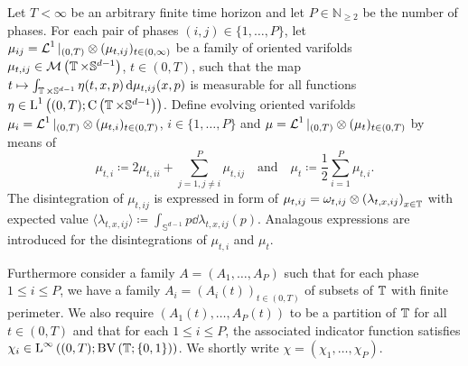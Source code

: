 \begin{definition}
	\label{de_giorgi_varifold_solutions_for_mmcf}
	Let $T < \infty $ be an arbitrary finite time horizon and let $ P \in 
	\mathbb{ N }_{ \geq 2 } $ be the number of phases. For each 
	pair of phases $ ( i , j ) \in \{ 1 , \dotsc, P \} $, let 
	$ \mu_{ i j } = \operatorname{\mathcal{L}}^{ 1 }|_{ ( 0 , T ) } \otimes ( \mu_{ t , i j } )_{ t 
	\in ( 0 , \infty ) } $ be a family of oriented 
	varifolds 
	$ \mu_{ t , ij } \in \mathcal{ M } \left(
	\operatorname{\mathbb{T}} \times \mathbb{ S }^{ d - 1 }
	\right) $,
	$ t \in ( 0 , T ) $, such that the map 
	$ t \mapsto \int_{ \operatorname{\mathbb{T}} \times \mathbb{ S }^{ d - 1 } }
	\eta ( t , x , p )
	\dd{ \mu_{ t ,i j } ( x, p ) }$
	is measurable for all functions 
	$ \eta \in \operatorname{L}^{ 1 } \left(	
	( 0 , T ) ; \operatorname{C} \left( \operatorname{\mathbb{T}} \times \mathbb{ S }^{ d- 1 } 
	\right) 
	\right) $.
	Define evolving oriented varifolds $ \mu_{ i } = \operatorname{\mathcal{L}}^{ 1 }|_{ ( 0 , T 
		) } \otimes ( \mu_{ t , i } )_{ t \in ( 0 , T ) } $, $ i \in \{ 1, 
	\dotsc, P \} $ and $ \mu = \operatorname{\mathcal{L}}^{ 1 }|_{ ( 0 , T ) } \otimes ( \mu_{ t 
	} )_{ t \in ( 0 , T ) } $ by means of
	\begin{equation*}
		\mu_{ t , i }
		\coloneqq
		2 \mu_{ t , i i }
		+
		\sum_{ j = 1 , j \neq i }^{ P }
		\mu_{ t , i j }
		\quad \text{and} \quad
		\mu_{ t }
		\coloneqq
		\frac{ 1 }{ 2 }
		\sum_{ i = 1 }^{ P }
		\mu_{ t, i }.
	\end{equation*}
	The disintegration of $ \mu_{ t , i j } $ is expressed in form of 
	$ \mu_{ t , i j } = \omega_{ t ,i j } \otimes \left( \lambda _{ t , x , i j 
	} \right)_{ x \in \operatorname{\mathbb{T}} } $ with expected value
	$ \langle \lambda_{ t , x , i j } \rangle 
	\coloneqq
	\int_{ \mathbb{ S }^{ d - 1 } }
	p 
	\dd{ \lambda_{ t , x , i j } ( p ) } $.
	Analagous expressions are introduced for the disintegrations of $ \mu_{ t, 
		i } $ and $ \mu_{ t } $.
	
	Furthermore consider a family 
	$ A = \left( A_{ 1 } , \dotsc , A_{ P } \right) $ 
	such that for each phase $ 1 \leq i \leq P $, we have a family
	$ A_{ i } = ( A_{ i } ( t ) )_{ t \in ( 0 , T ) } $ of subsets of $ 
	\operatorname{\mathbb{T}} $ with finite perimeter. We also require 
	$ \left( A_{ 1 } ( t ) , \dotsc, A_{ P } ( t ) \right) $
	to be a partition of $ \operatorname{\mathbb{T}} $ for all $ t \in ( 0 , T ) $ and 
	that for each $ 1 \leq i \leq P $, the associated indicator function 
	satisfies 
	$ \chi_{ i } \in \operatorname{L}^{ \infty } \left(
	( 0 , T ) ;
	\operatorname{BV} \left( \operatorname{\mathbb{T}} ; \{ 0 , 1 \} \right)
	\right) $.
	We shortly write $ \chi = \left( \chi_{ 1 } , \dotsc, \chi_{ P } \right) $.
	

\end{definition}
